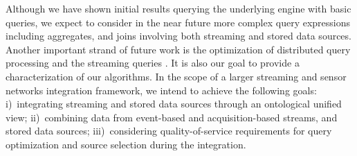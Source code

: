 Although we have shown initial results querying the underlying \snee engine with basic queries, we expect to consider in the near future more complex query expressions including aggregates, and joins involving both streaming and stored data sources.
Another important strand of future work is the optimization of distributed query processing \cite{Kossmann_00} and the streaming queries \cite{Abadi_2005,Galpin_09}.
It is also our goal to provide a characterization of our algorithms. 
In the scope of a larger streaming and sensor networks integration framework, we intend to achieve the following goals: %
i)~integrating streaming and stored data sources through an ontological unified view; %
ii)~combining data from event-based and acquisition-based streams, and stored data sources; %
iii)~considering quality-of-service requirements for query optimization and source selection during the integration.




